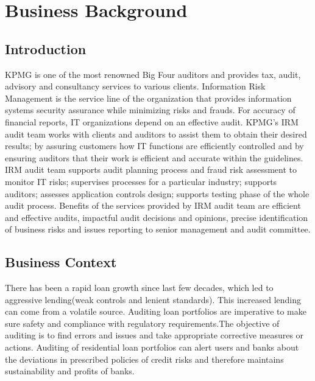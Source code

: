 %
%
%
%

\chapter{Business Background}\label{C.Business.Background}

\section{Introduction}\label{S.intro2}
KPMG is one of the most renowned Big Four auditors and provides tax, audit, advisory and consultancy services to various clients. Information Risk Management is the service line of the organization that provides information systems security assurance while minimizing risks and frauds. For accuracy of financial reports, IT organizations depend on an effective audit. KPMG's IRM audit team works with clients and auditors to assist them to obtain their desired results; by assuring customers how IT functions are efficiently controlled and by ensuring auditors that their work is efficient and accurate within the guidelines. IRM audit team supports audit planning process and fraud risk assessment to monitor IT risks; supervises processes for a particular industry; supports auditors; assesses application controls design; supports testing phase of the whole audit process. Benefits of the services provided by IRM audit team are efficient and effective audits, impactful audit decisions and opinions, precise identification of business risks and issues reporting to senior management and audit committee.\\

\section{Business Context}
There has been a rapid loan growth since last few decades, which led to aggressive lending(weak controls and lenient standards). This increased lending can come from a volatile source. Auditing loan portfolios are imperative to make sure safety and compliance with regulatory requirements.The objective of auditing is to find errors and issues and take appropriate corrective measures or actions. Auditing of residential loan portfolios can alert users and banks about the deviations in prescribed policies of credit risks and therefore maintains sustainability and profits of banks.\\




